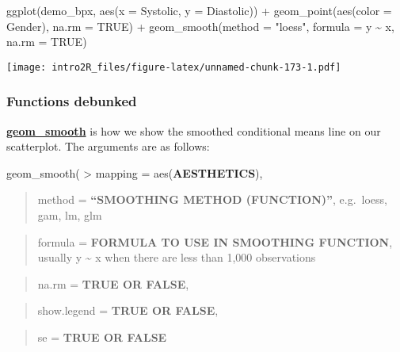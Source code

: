 \documentclass[
]{book}
\newenvironment{Shaded}{\begin{snugshade}}{\end{snugshade}}
\newcommand{\AttributeTok}[1]{\textcolor[rgb]{0.77,0.63,0.00}{#1}}
\newcommand{\ConstantTok}[1]{\textcolor[rgb]{0.00,0.00,0.00}{#1}}
\newcommand{\FunctionTok}[1]{\textcolor[rgb]{0.00,0.00,0.00}{#1}}
\newcommand{\NormalTok}[1]{#1}
\newcommand{\SpecialCharTok}[1]{\textcolor[rgb]{0.00,0.00,0.00}{#1}}
\newcommand{\StringTok}[1]{\textcolor[rgb]{0.31,0.60,0.02}{#1}}
\begin{document}
\begin{Shaded}
\begin{Highlighting}[]
\FunctionTok{ggplot}\NormalTok{(demo\_bpx, }\FunctionTok{aes}\NormalTok{(}\AttributeTok{x =}\NormalTok{ Systolic, }\AttributeTok{y =}\NormalTok{ Diastolic)) }\SpecialCharTok{+}
    \FunctionTok{geom\_point}\NormalTok{(}\FunctionTok{aes}\NormalTok{(}\AttributeTok{color =}\NormalTok{ Gender), }
               \AttributeTok{na.rm =} \ConstantTok{TRUE}\NormalTok{) }\SpecialCharTok{+}
    \FunctionTok{geom\_smooth}\NormalTok{(}\AttributeTok{method =} \StringTok{"loess"}\NormalTok{,}
                \AttributeTok{formula =}\NormalTok{ y }\SpecialCharTok{\textasciitilde{}}\NormalTok{ x,}
                \AttributeTok{na.rm =} \ConstantTok{TRUE}\NormalTok{)}
\end{Highlighting}
\end{Shaded}

\texttt{[image: intro2R\_files/figure-latex/unnamed-chunk-173-1.pdf]}

\hypertarget{functions-debunked-18}{%
\subsubsection{Functions debunked}\label{functions-debunked-18}}

\href{https://ggplot2.tidyverse.org/reference/ggplot.html}{\textbf{geom\_smooth}} is how we show the smoothed conditional means line on our scatterplot. The arguments are as follows:

geom\_smooth(
\textgreater{} mapping = aes(\textbf{AESTHETICS}),

\begin{quote}
method = \textbf{``SMOOTHING METHOD (FUNCTION)''}, e.g.~loess, gam, lm, glm
\end{quote}

\begin{quote}
formula = \textbf{FORMULA TO USE IN SMOOTHING FUNCTION}, usually y \textasciitilde{} x when there are less than 1,000 observations
\end{quote}

\begin{quote}
na.rm = \textbf{TRUE OR FALSE},
\end{quote}

\begin{quote}
show.legend = \textbf{TRUE OR FALSE},
\end{quote}

\begin{quote}
se = \textbf{TRUE OR FALSE}
\end{quote}
\end{document}
